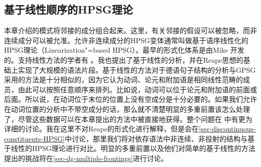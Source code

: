 \subsection{基于线性顺序的HPSG理论}
\label{sec-linearization-HPSG}

本章介绍的模式将邻接的成分组合起来。这里，有关邻接的假设可以被忽略，而非连续成分可以被允准。允许非连续成分的HPSG变体通常叫做基于语序线性化的HPSG理论（Linearization"=based HPSG）。最早的形式化体系是由Mike  \citet{Reape91,Reape92a,Reape94a}开发的。支持线性方法的学者有 \citet{Kathol95a,Kathol2000a,DS99a,RS99a,Crysmann2003c,BS2004a,Sato:06cluk,Wetta2011a}。我也提出了基于线性的分析\citep{Mueller99a,Mueller2002b}，并在Reape思想的基础上实现了大规模的语法片段\citep{Babel}。基于线性的方法对于德语句子结构的分析与GPSG采用的方法是十分相似的，因为它认为动词、论元和附加语是相同线性范畴的成员，由此可以按照任意顺序来排列。比如说，动词可以位于论元和附加语的前面或后面。所以说，在动词位于末位的位置上没有空成分是十分必要的。如果我们允许在动词位置的分析中不带空成分的话，那么就不清楚明显的多重前置该怎么处理了，尽管这些数据可以在本章提出的方法中被直接地获得。整个问题在 中有更为详细的讨论。我在这里不对Reape的形式化进行解释，但是会在\ref{sec-discontinuous-constituents-HPSG}中讨论，那里我们将对依存语法中非连续、非投射的结构与基于线性的HPSG理论进行对比。明显的多重前置以及他们对简单的基于线性的方法提出的挑战将在\ref{sec-dg-multiple-frontings}进行讨论。
